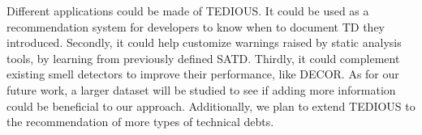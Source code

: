 Different applications could be made of \ac{TEDIOUS}. It could be used as a recommendation system for developers to know when to document \ac{TD} they introduced. Secondly, it could help customize warnings raised by static analysis tools, by learning from previously defined \ac{SATD}. Thirdly, it could complement existing smell detectors to improve their performance, like \ac{DECOR}. As for our future work, a larger dataset will be studied to see if adding more information could be beneficial to our approach. Additionally, we plan to extend \ac{TEDIOUS} to the recommendation of more types of technical debts.




